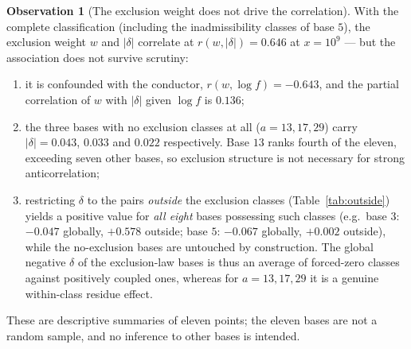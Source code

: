 \documentclass[11pt,reqno]{amsart}
\theoremstyle{plain}
\theoremstyle{definition}
\newtheorem{observation}[theorem]{Observation}
\begin{document}
\begin{observation}[The exclusion weight does not drive the correlation]
\label{obs:refutation}
With the complete classification (including the inadmissibility classes of
base $5$), the exclusion weight $w$ and $|\delta|$ correlate at
$r(w, |\delta|) = 0.646$ at $x = 10^9$ --- but the association does not
survive scrutiny:
\begin{enumerate}
\item it is confounded with the conductor, $r(w, \log f) = -0.643$, and the
      partial correlation of $w$ with $|\delta|$ given $\log f$ is $0.136$;
\item the three bases with no exclusion classes at all ($a = 13, 17, 29$)
      carry $|\delta| = 0.043$, $0.033$ and $0.022$ respectively. Base $13$
      ranks fourth of the eleven, exceeding seven other bases, so exclusion
      structure is not necessary for strong anticorrelation;
\item restricting $\delta$ to the pairs \emph{outside} the exclusion classes
      (Table~\ref{tab:outside}) yields a positive value for \emph{all eight}
      bases possessing such classes (e.g.\ base $3$: $-0.047$ globally,
      $+0.578$ outside; base $5$: $-0.067$ globally, $+0.002$ outside), while
      the no-exclusion bases are untouched by construction. The global
      negative $\delta$ of the exclusion-law bases is thus an average of
      forced-zero classes against positively coupled ones, whereas for
      $a = 13, 17, 29$ it is a genuine within-class residue effect.
\end{enumerate}
These are descriptive summaries of eleven points; the eleven bases are not a
random sample, and no inference to other bases is intended.
\end{observation}
\end{document}
